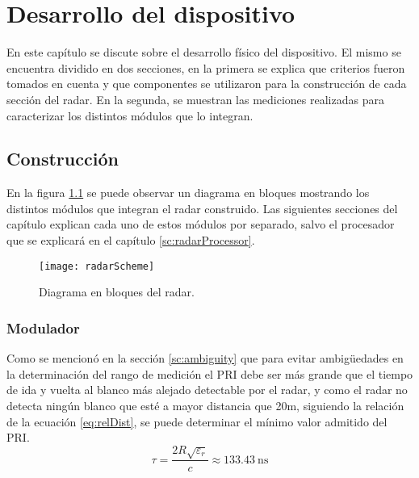 \chapter{Desarrollo del dispositivo} \label{ch:development}

\ifpdf
    \graphicspath{{Chapter3/Figs/Raster/}{Chapter3/Figs/PDF/}{Chapter3/Figs/}}
\else
    \graphicspath{{Chapter3/Figs/Vector/}{Chapter3/Figs/}}
\fi

En este capítulo se discute sobre el desarrollo físico del dispositivo. El mismo se encuentra dividido en dos secciones, en la primera se explica que criterios fueron tomados en cuenta y que componentes se utilizaron para la construcción de cada sección del radar. En la segunda, se muestran las mediciones realizadas para caracterizar los distintos módulos que lo integran.


\section{Construcción}

En la figura \ref{fig:radarDiagram} se puede observar un diagrama en bloques mostrando los distintos módulos que integran el radar construido. Las siguientes secciones del capítulo explican cada uno de estos módulos por separado, salvo el procesador que se explicará en el capítulo \ref{sc:radarProcessor}.
\begin{figure}
 \centering
 \texttt{[image: radarScheme]}
 \caption{Diagrama en bloques del radar.}
 \label{fig:radarDiagram}
\end{figure}


\subsection{Modulador}

Como se mencionó en la sección \ref{sc:ambiguity} que para evitar ambigüedades en la determinación del rango de medición el PRI debe ser más grande que el tiempo de ida y vuelta al blanco más alejado detectable por el radar, y como el radar no detecta ningún blanco que esté a mayor distancia que 20m, siguiendo la relación de la ecuación \ref{eq:relDist}, se puede determinar el mínimo valor admitido del PRI.
\begin{equation}
  \tau = \dfrac{2R\sqrt{\varepsilon_r}}{c} \approx \SI{133.43}{\nano\second}
\end{equation}

